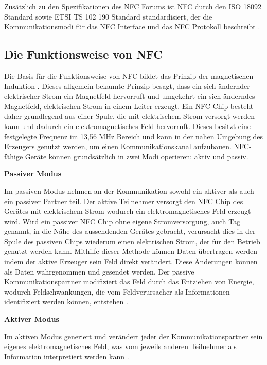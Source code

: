 Zusätzlich zu den Spezifikationen des NFC Forums ist NFC durch den ISO 18092 Standard sowie ETSI TS 102 190 Standard standardisiert, der die Kommunikationsmodi für das NFC Interface und das NFC Protokoll beschreibt \cite{iso:iec18092:2013, etsi:ts:102:190}.

\subsection{Die Funktionsweise von NFC}

Die Basis für die Funktionsweise von NFC bildet das Prinzip der magnetischen Induktion \cite{introToRfid}. Dieses allgemein bekannte Prinzip besagt, dass ein sich ändernder elektrischer Strom ein Magnetfeld hervorruft und umgekehrt ein sich änderndes Magnetfeld, elektrischen Strom in einem Leiter erzeugt. Ein NFC Chip besteht daher grundlegend aus einer Spule, die mit elektrischem Strom versorgt werden kann und dadurch ein elektromagnetisches Feld hervorruft. Dieses besitzt eine festgelegte Frequenz im 13,56 MHz Bereich \cite{introToRfid} und kann in der nahen Umgebung des Erzeugers genutzt werden, um einen Kommunikationskanal aufzubauen. NFC-fähige Geräte können grundsätzlich in zwei Modi operieren: aktiv und passiv. 
\newline

\textbf{Passiver Modus}

Im passiven Modus nehmen an der Kommunikation sowohl ein aktiver als auch ein passiver Partner teil. 
Der aktive Teilnehmer versorgt den NFC Chip des Gerätes mit elektrischem Strom wodurch ein elektromagnetisches Feld erzeugt wird. Wird ein passiver NFC Chip ohne eigene Stromversorgung, auch Tag genannt, in die Nähe des aussendenden Gerätes gebracht, verursacht dies in der Spule des passiven Chips wiederum einen elektrischen Strom, der für den Betrieb genutzt werden kann. 
Mithilfe dieser Methode können Daten übertragen werden indem der aktive Erzeuger sein Feld direkt verändert. Diese Änderungen können als Daten wahrgenommen und gesendet werden. Der passive Kommunikationspartner modifiziert das Feld durch das Entziehen von Energie, wodurch Feldschwankungen, die vom Feldverursacher als Informationen identifiziert werden können, entstehen \cite{Madlmayr2014}. 
\newline

\textbf{Aktiver Modus}

Im aktiven Modus generiert und verändert jeder der Kommunikationspartner sein eigenes elektromagnetisches Feld, was vom jeweils anderen Teilnehmer als Information interpretiert werden kann \cite{Madlmayr2014}. 
\newline

